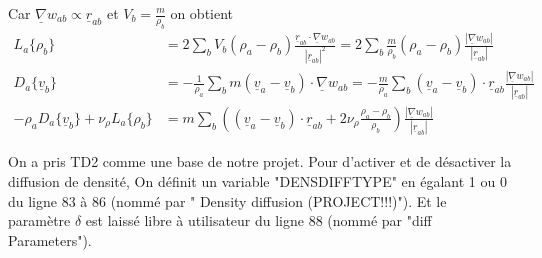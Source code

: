 \documentclass{article}
\newcommand\ul[1]{\underline{#1}}
\newcommand\uGrad{\ul{\nabla}}
\begin{document}
Car $\ul{\nabla}w_{ab} \propto \ul{r}_{ab}$ et $V_b = \frac{m}{\rho_b}$ on obtient
\begin{align*}
    L_{a}\{ \rho_{b} \} & = 2 \sum_b V_b(\rho_a - \rho_b)\frac{ \ul{r}_{ab} \cdot \uGrad w_{ab} }{ |\ul{r}_{ab}|^2 } = 2 \sum_b \frac{m}{\rho_b}(\rho_a - \rho_b)\frac{ |\uGrad w_{ab}| }{ |\ul{r}_{ab}| } \\
    D_{a}\{\ul{v}_{b}\} & = -\frac{1}{\rho_a} \sum_b m(\ul{v}_a - \ul{v}_b) \cdot \uGrad w_{ab} = -\frac{m}{\rho_a} \sum_b (\ul{v}_a - \ul{v}_b) \cdot \ul{r}_{ab} \frac{ | \uGrad w_{ab} | }{ |\ul{r}_{ab}| } \\
	-\rho_{a}D_{a}\{\ul{v}_{b}\}+\nu_{\rho}L_{a}\{\rho_{b}\} &= m\sum_b \left( (\ul{v}_a - \ul{v}_b) \cdot \ul{r}_{ab}  + 2 \nu_\rho \frac{\rho_a - \rho_b}{\rho_b} \right)  \frac{ |\uGrad w_{ab}| }{ |\ul{r}_{ab}| }
\end{align*}

On a pris TD2 comme une base de notre projet. Pour d'activer et de désactiver la diffusion de densité, On définit un variable "DENSDIFFTYPE" en égalant 1 ou 0 du ligne 83 à 86 (nommé par " Density diffusion (PROJECT!!!)"). Et le paramètre $\delta$ est laissé libre à utilisateur du ligne 88 (nommé par "diff Parameters").\par
  
\end{document}

